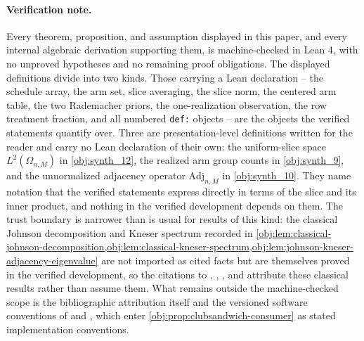 \paragraph{Verification note.}
Every theorem, proposition, and assumption displayed in this paper, and every internal algebraic derivation supporting them, is machine-checked in Lean 4, with no unproved hypotheses and no remaining proof obligations. The displayed definitions divide into two kinds. Those carrying a Lean declaration -- the schedule array, the arm set, slice averaging, the slice norm, the centered arm table, the two Rademacher priors, the one-realization observation, the row treatment fraction, and all numbered \texttt{def:} objects -- are the objects the verified statements quantify over. Three are presentation-level definitions written for the reader and carry no Lean declaration of their own: the uniform-slice space \(L^2(\Omega_{n,M})\) in \cref{obj:synth_12}, the realized arm group counts in \cref{obj:synth_9}, and the unnormalized adjacency operator \(\mathrm{Adj}_{n,M}\) in \cref{obj:synth_10}. They name notation that the verified statements express directly in terms of the slice and its inner product, and nothing in the verified development depends on them. The trust boundary is narrower than is usual for results of this kind: the classical Johnson decomposition and Kneser spectrum recorded in \cref{obj:lem:classical-johnson-decomposition,obj:lem:classical-kneser-spectrum,obj:lem:johnson-kneser-adjacency-eigenvalue} are not imported as cited facts but are themselves proved in the verified development, so the citations to \citet{Delsarte1973}, \citet{BrouwerCohenNeumaier1989}, \citet{Filmus2016}, and \citet{BrouwerEtAl2018} attribute these classical results rather than assume them. What remains outside the machine-checked scope is the bibliographic attribution itself and the versioned software conventions of \citet{ClubSandwich2026} and \citet{Sandwich2026}, which enter \cref{obj:prop:clubsandwich-consumer} as stated implementation conventions.
